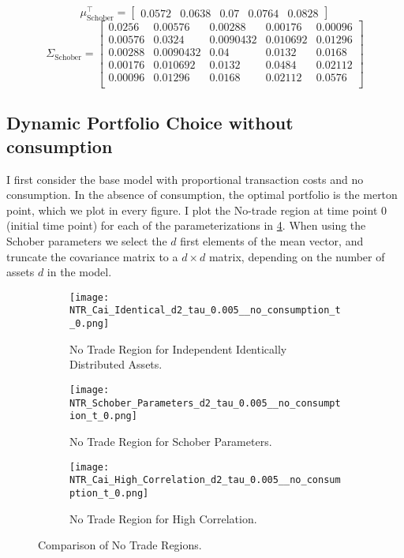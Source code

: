 \documentclass[11pt]{article}
\begin{document}
\[
\mu_{\text{Schober}}^\top = 
\begin{bmatrix}
0.0572 & 0.0638 & 0.07 & 0.0764 & 0.0828
\end{bmatrix}
\]
\[
\Sigma_{\text{Schober}} = 
\begin{bmatrix}
0.0256 & 0.00576 & 0.00288 & 0.00176 & 0.00096 \\
0.00576 & 0.0324 & 0.0090432 & 0.010692 & 0.01296 \\
0.00288 & 0.0090432 & 0.04 & 0.0132 & 0.0168 \\
0.00176 & 0.010692 & 0.0132 & 0.0484 & 0.02112 \\
0.00096 & 0.01296 & 0.0168 & 0.02112 & 0.0576 \\
\end{bmatrix}
\]
\subsection{Dynamic Portfolio Choice without consumption} \label{Subsection: Results_NoConsumption}
I first consider the base model with proportional transaction costs
and no consumption. In the absence of consumption, the optimal portfolio is the merton point, which we plot in every figure.
I plot the No-trade region at time point 0 (initial time point) for each of the parameterizations in \ref{fig:comparison_NTR}.
When using the Schober parameters we select the $d$ first elements of the mean vector, and truncate the covariance matrix to a $d \times d$ matrix,
depending on the number of assets $d$ in the model.
\begin{figure}[!ht]
    \centering
    \begin{subfigure}[t]{\textwidth}
        \centering
        \texttt{[image: NTR\_Cai\_Identical\_d2\_tau\_0.005\_\_no\_consumption\_t\_0.png]}
        \caption{No Trade Region for Independent Identically Distributed Assets.}
        \label{fig:NTR_2d_iid}
    \end{subfigure}

    \vspace{1em}

    \begin{subfigure}[t]{0.48\textwidth}
        \centering
        \texttt{[image: NTR\_Schober\_Parameters\_d2\_tau\_0.005\_\_no\_consumption\_t\_0.png]}
        \caption{No Trade Region for Schober Parameters.}
        \label{fig:NTR_2d_Schober}
    \end{subfigure}%
    \hfill
    \begin{subfigure}[t]{0.48\textwidth}
        \centering
        \texttt{[image: NTR\_Cai\_High\_Correlation\_d2\_tau\_0.005\_\_no\_consumption\_t\_0.png]}
        \caption{No Trade Region for High Correlation.}
        \label{fig:NTR_2d_High_Correlation}
    \end{subfigure}

    \caption{Comparison of No Trade Regions.}
    \label{fig:comparison_NTR}
\end{figure}
\end{document}

